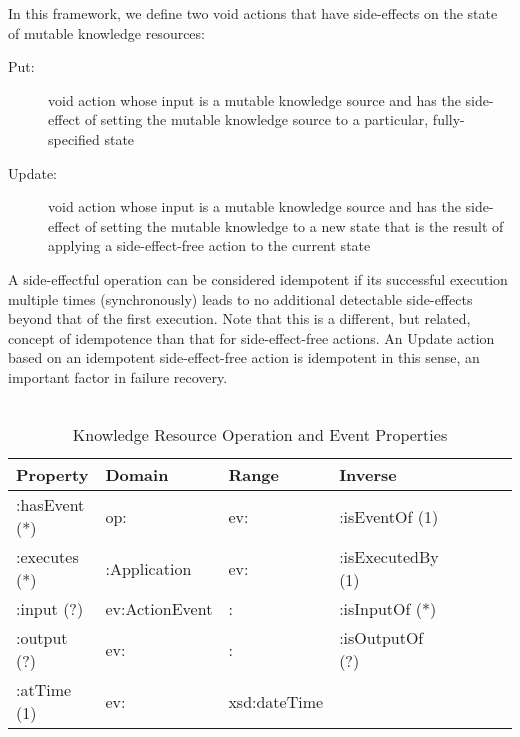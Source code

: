 \documentclass[runningheads]{llncs}
\begin{document}
In this framework, we define two void actions that have side-effects on the state of mutable knowledge resources:
  \begin{description}
    \item[Put:] void action whose input is a mutable knowledge source and has the side-effect of setting the mutable knowledge source to a particular, fully-specified state
    \item[Update:] void action whose input is a mutable knowledge source and has the side-effect of setting the mutable knowledge to a new state that is the result of applying a side-effect-free action to the current state
  \end{description}
  
  A side-effectful operation can be considered idempotent if its successful execution multiple times (synchronously) leads to no additional detectable side-effects beyond that of the first execution. Note that this is a different, but related, concept of idempotence than that for side-effect-free actions. An Update action based on an idempotent side-effect-free action is idempotent in this sense, an important factor in failure recovery.\\
\\
\begin{table}[h]
\centering
\begin{tabular}{|l|l|l|l|l|l|l|l|}
\hline
\textbf{Property}  &\textbf{Domain}  & \textbf{Range}  & \textbf{Inverse}
\\ \hline
:hasEvent (*)      & op:               & ev:             & :isEventOf  (1)         \\ \hline
:executes (*)      & :Application      & ev:             & :isExecutedBy  (1)         \\ \hline
:input (?)         & ev:ActionEvent    &    :          & :isInputOf  (*)         \\ \hline
:output (?)        & ev:               &    :          & :isOutputOf  (?)         \\ \hline
:atTime (1)        & ev:               &    xsd:dateTime          &          \\ \hline
\end{tabular}
\caption{Knowledge Resource Operation and Event Properties}
\vspace{-0.3cm}
\label{kropprop}
\end{table}

\vspace{-0.8cm}
\end{document}

